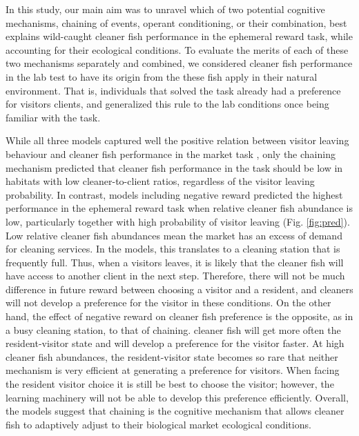 \documentclass[]{rsos}%
\begin{document}
In this study, our main aim was to unravel which of two potential
cognitive mechanisms, chaining of events, operant conditioning,
or their combination, best explains wild-caught cleaner fish
performance in the ephemeral reward task, while accounting for their
ecological conditions. To evaluate the merits of each of these two mechanisms
separately and combined, we considered cleaner fish performance
in the lab test to have its origin from the these fish apply
in their natural environment. That is, individuals that
solved the task already had a preference for
visitors clients, and generalized this rule to the lab conditions
once being familiar with the task.

While all three models captured well the positive relation between visitor
leaving behaviour and cleaner fish performance in
the market task \citep{triki_Biological_2019}, only the chaining mechanism
predicted that cleaner fish performance in the task should be low in
habitats with low cleaner-to-client ratios, regardless of the
visitor leaving probability. In contrast, models including
negative reward predicted the highest performance in the ephemeral
reward task when relative cleaner fish abundance is low, particularly
together with high probability of visitor leaving (Fig. \ref{fig:pred}).
Low relative cleaner fish abundances mean the market has an excess of demand for
cleaning services. In the models, this translates to a cleaning station
that is frequently full. Thus, when a visitors leaves, it is likely that the
cleaner fish will have access to another client in the next step. Therefore,
there will not be much difference in future reward between choosing
a visitor and a resident, and cleaners will not develop a preference for the
visitor in these conditions. On the other hand, the effect of negative reward
on cleaner fish preference is the opposite, as in a busy cleaning station, to
that of chaining. cleaner fish will get more often the resident-visitor
state and will develop a preference for the visitor faster.
At high cleaner fish abundances, the resident-visitor state
becomes so rare that neither mechanism is very efficient
at generating a preference for visitors. When facing the resident
visitor choice it is still be best to choose the visitor; however,
the learning machinery will not be able to develop this preference
efficiently. Overall, the models suggest that chaining is the cognitive
mechanism that allows cleaner fish to adaptively adjust to their
biological market ecological conditions.
\end{document}
